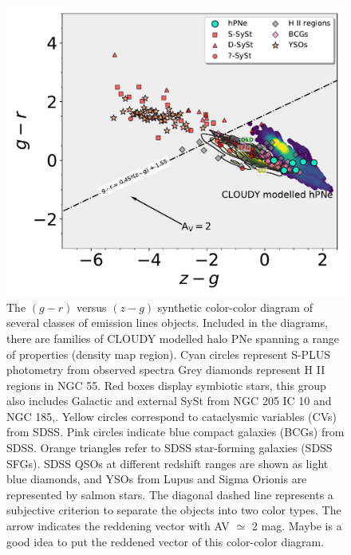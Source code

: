 \documentclass[fleqn,usenatbib]{mnras}
\begin{document}
\begin{figure}
	\includegraphics[width=0.9\linewidth]{Figs/Fig-SPLUS-gr-zg.pdf}
        \caption{The $(g - r)$ versus $(z - g)$ synthetic color-color diagram of
          several classes of emission lines objects. Included in the diagrams, there
          are families of CLOUDY modelled halo PNe spanning a range of properties (density
          map region). Cyan circles represent S-PLUS photometry from observed spectra
          Grey diamonds represent H II regions in NGC 55. Red
          boxes display symbiotic stars, this group also includes Galactic and
          external SySt from NGC 205 IC 10 and NGC 185,. Yellow circles correspond to
          cataclysmic variables (CVs) from SDSS. Pink circles indicate  blue compact
          galaxies (BCGs) from SDSS. Orange triangles refer to SDSS
          star-forming galaxies (SDSS SFGs). SDSS QSOs at different redshift
          ranges are shown as light blue diamonds, and YSOs from Lupus and
          Sigma Orionis are represented by salmon stars. The diagonal dashed line represents
         a subjective criterion to separate the objects into two color types.  The arrow
         indicates the reddening vector with AV $\simeq$ 2 mag. {\sc Maybe 
         is a good idea to put the reddened vector of this color-color diagram.}}
    \label{fig:synthetic}
\end{figure}
\end{document}
